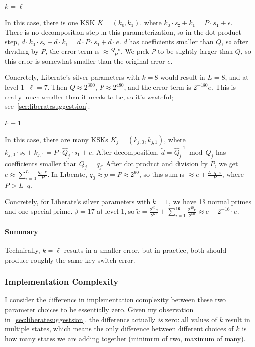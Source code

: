 \documentclass[../keyswitching.tex]{subfiles}
\begin{document}
\paragraph{$k=\ell$}
In this case, there is one KSK $K=(k_0, k_1)$, where $k_0\cdot s_2 + k_1 = P\cdot s_1+e$. There is no decomposition step in this parameterization, so in the dot product step, $d\cdot k_0\cdot s_2 + d\cdot k_1 = d\cdot P\cdot s_1 + d\cdot e$. $d$ has coefficients smaller than $Q$, so after dividing by $P$, the error term is $\approx \frac{Q\cdot e}{P}$. We pick $P$ to be slightly larger than $Q$, so this error is somewhat smaller than the original error $e$.

Concretely, Liberate's silver parameters with $k=8$ would result in $L=8$, and at level 1, $\ell=7$. Then $Q\approx 2^{300}$, $P\approx 2^{480}$, and the error term is $2^{-180}e$. This is really much smaller than it needs to be, so it's wasteful; see~\cref{sec:liberatesuggestsion}.

\paragraph{$k=1$}
In this case, there are many KSKs $K_j=(k_{j,0}, k_{j,1})$, where $k_{j,0}\cdot s_2 + k_{j,1} = P\cdot\hat{Q}_j\cdot s_1+e$. After decomposition, $\tilde{d}=\hat{Q}_j^{-1} \bmod Q_j$ has coefficients smaller than $Q_j=q_j$. After dot product and division by $P$, we get $\tilde{e}\approx\sum_{i=0}^{L} \frac{q_i\cdot e}{P}$. In Liberate, $q_0 \approx p=P\approx 2^{60}$, so this sum is $\approx e+\frac{L\cdot q\cdot e}{P}$, where $P>L\cdot q$.

Concretely, for Liberate's silver parameters with $k=1$, we have 18 normal primes and one special prime. $\beta=17$ at level 1, so $\tilde{e}=\frac{2^{60}e}{2^{60}} + \sum_{i=1}^{16} \frac{2^{40}e}{2^{60}} \approx e+ 2^{-16}\cdot e$.

\paragraph{Summary}
Technically, $k=\ell$ results in a smaller error, but in practice, both should produce roughly the same key-switch error.

\subsubsection{Implementation Complexity}
I consider the difference in implementation complexity between these two parameter choices to be essentially zero. Given my observation in~\cref{sec:liberatesuggestsion}, the difference actually \emph{is} zero: all values of $k$ result in multiple states, which means the only difference between different choices of $k$ is how many states we are adding together (minimum of two, maximum of many).
\end{document}

